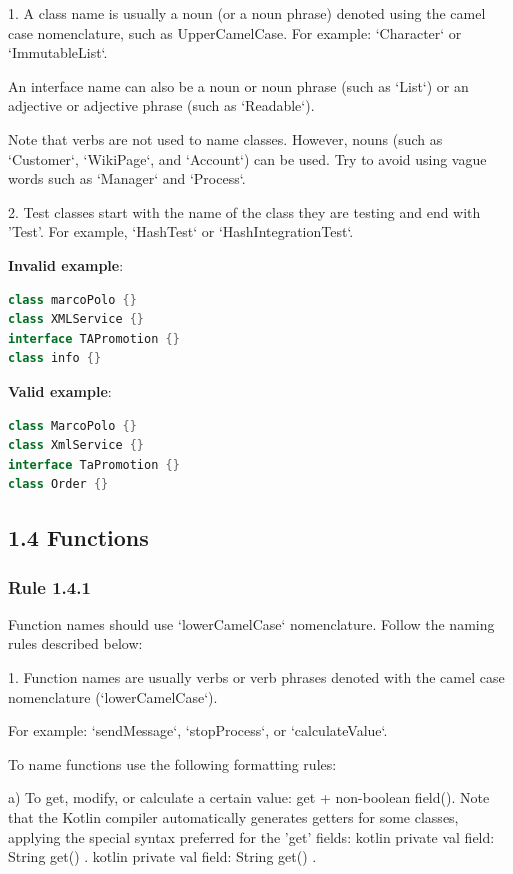 1.	A class name is usually a noun (or a noun phrase) denoted using the camel case nomenclature, such as UpperCamelCase. For example: `Character` or `ImmutableList`.

An interface name can also be a noun or noun phrase (such as `List`) or an adjective or adjective phrase (such as `Readable`).

Note that verbs are not used to name classes. However, nouns (such as `Customer`, `WikiPage`, and `Account`) can be used. Try to avoid using vague words such as `Manager` and `Process`.



2.	Test classes start with the name of the class they are testing and end with 'Test'. For example, `HashTest` or `HashIntegrationTest`.



\textbf{Invalid example}:

\begin{lstlisting}[language=Kotlin]
class marcoPolo {}
class XMLService {}
interface TAPromotion {}
class info {}
\end{lstlisting}


\textbf{Valid example}:

\begin{lstlisting}[language=Kotlin]
class MarcoPolo {}
class XmlService {}
interface TaPromotion {}
class Order {}
\end{lstlisting}


\subsection*{\textbf{1.4 Functions}}

\subsubsection*{\textbf{Rule 1.4.1}}
\leavevmode\newline

Function names should use `lowerCamelCase` nomenclature. Follow the naming rules described below:

1.	Function names are usually verbs or verb phrases denoted with the camel case nomenclature (`lowerCamelCase`).

For example: `sendMessage`, `stopProcess`, or `calculateValue`.

To name functions use the following formatting rules:



a) To get, modify, or calculate a certain value: get + non-boolean field(). Note that the Kotlin compiler automatically generates getters for some classes, applying the special syntax preferred for the 'get' fields: kotlin private val field: String get() { }. kotlin private val field: String get() { }.

